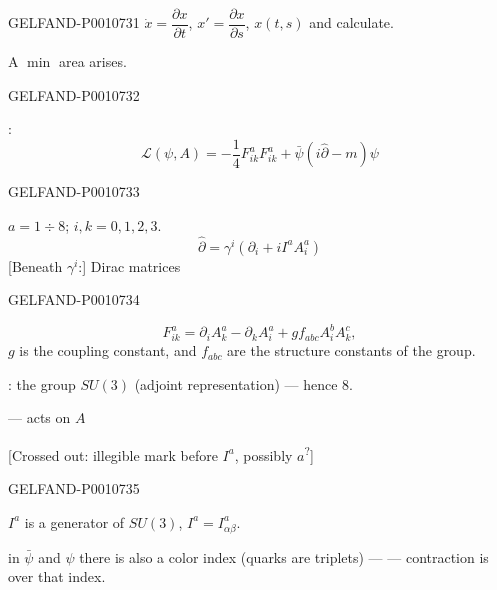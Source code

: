 \begin{GelfandAdjacentEvidence}{GELFAND-P001073}{1}
$\dot x=\dfrac{\partial x}{\partial t}$, $x'=\dfrac{\partial x}{\partial s}$, $x(t,s)$ and calculate.

A $\min$ area arises.
\end{GelfandAdjacentEvidence}
\begin{GelfandAdjacentEvidence}{GELFAND-P001073}{2}



:
\begin{equation*}
\mathcal L(\psi,A)=-\frac14F_{ik}^aF_{ik}^a+\bar\psi(i\hat\partial-m)\psi
\tag{22}
\end{equation*}
\end{GelfandAdjacentEvidence}
\begin{GelfandAdjacentEvidence}{GELFAND-P001073}{3}


$a=1\div8$; $i,k=0,1,2,3$.
\begin{equation*}
\hat\partial=\gamma^i(\partial_i+iI^aA_i^a)
\tag{23}
\end{equation*}
[Beneath $\gamma^i$:] Dirac matrices
\end{GelfandAdjacentEvidence}
\begin{GelfandAdjacentEvidence}{GELFAND-P001073}{4}

\begin{equation*}
F_{ik}^a=\partial_i A_k^a-\partial_k A_i^a+g f_{abc}A_i^bA_k^c,
\tag{24}
\end{equation*}
$g$ is the coupling constant, and $f_{abc}$ are the structure constants of the group.

: the group $SU(3)$ (adjoint representation) — hence 8.

— acts on $A$

[Crossed out: illegible mark before \(I^a\), possibly \(a\)\textsuperscript{?}]
\end{GelfandAdjacentEvidence}
\begin{GelfandAdjacentEvidence}{GELFAND-P001073}{5}


$I^a$ is a generator of $SU(3)$, $I^a=I^a_{\alpha\beta}$.

in $\bar\psi$ and $\psi$ there is also a color index (quarks are triplets) — — contraction is over that index.
\end{GelfandAdjacentEvidence}
